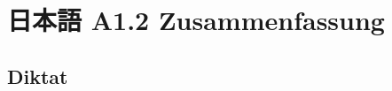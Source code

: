 \documentclass[12pt,ngerman]{article}
\begin{document}
%
%
%
%
%
%

\newpage

\section*{日本語 A1.2 Zusammenfassung}

\subsection*{Diktat}
\end{document}
